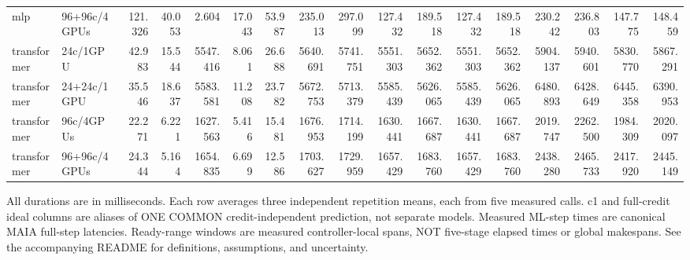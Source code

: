 \begin{landscape}
\begin{table}[p]
{\begin{tabular}{llrrrrrrrrrrrrrrr}
mlp & 96+96c/4GPUs & 121.326 & 40.053 & 2.604 & 17.043 & 53.987 & 235.013 & 297.099 & 127.432 & 189.518 & 127.432 & 189.518 & 230.242 & 236.803 & 147.775 & 148.459 \\
transformer & 24c/1GPU & 42.983 & 15.544 & 5547.416 & 8.061 & 26.688 & 5640.691 & 5741.751 & 5551.303 & 5652.362 & 5551.303 & 5652.362 & 5904.137 & 5940.601 & 5830.770 & 5867.291 \\
transformer & 24+24c/1GPU & 35.546 & 18.637 & 5583.581 & 11.208 & 23.782 & 5672.753 & 5713.379 & 5585.439 & 5626.065 & 5585.439 & 5626.065 & 6480.893 & 6428.649 & 6445.358 & 6390.953 \\
transformer & 96c/4GPUs & 22.271 & 6.221 & 1627.563 & 5.416 & 15.481 & 1676.953 & 1714.199 & 1630.441 & 1667.687 & 1630.441 & 1667.687 & 2019.747 & 2262.500 & 1984.309 & 2020.097 \\
transformer & 96+96c/4GPUs & 24.344 & 5.164 & 1654.835 & 6.699 & 12.586 & 1703.627 & 1729.959 & 1657.429 & 1683.760 & 1657.429 & 1683.760 & 2438.280 & 2465.733 & 2417.920 & 2445.149 \\
\bottomrule
\end{tabular}%
}
\par\smallskip
\begin{minipage}{\linewidth}\footnotesize
All durations are in milliseconds. Each row averages three independent
repetition means, each from five measured calls. c1 and full-credit ideal columns
are aliases of ONE COMMON credit-independent prediction, not separate models.
Measured ML-step times are canonical MAIA full-step latencies. Ready-range windows
are measured controller-local spans, NOT five-stage elapsed times or global
makespans. See the accompanying README for definitions, assumptions, and uncertainty.
\end{minipage}
\end{table}
\end{landscape}
